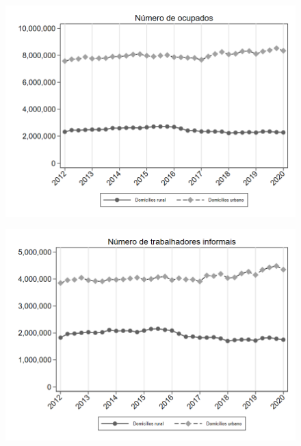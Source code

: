 \begin{frame}[label=_composicao_demografica_rural_urbano_n_de_ocupacao]{}
\textit{\hyperlink{_composicao_demografica_rural_urbano}{}}
\begin{figure}
  \centering
  \includegraphics[width=1\linewidth]{../../analysis/output/composicao_demografica/area_geografica/_composicao_demografica_rural_urbano_n_de_ocupacao.png}
  \caption{}
  \label{fig:_composicao_demografica_rural_urbano_n_de_ocupacao}
\end{figure}
\end{frame}

\begin{frame}[label=_composicao_demografica_rural_urbano_n_de_informalidade]{}
\textit{\hyperlink{_composicao_demografica_rural_urbano}{}}
\begin{figure}
  \centering
  \includegraphics[width=1.0\linewidth]{../../analysis/output/composicao_demografica/area_geografica/_composicao_demografica_rural_urbano_n_de_informalidade.png}
  \caption{}
  \label{fig:_composicao_demografica_rural_urbano_n_de_informalidade}
\end{figure}
\end{frame}

